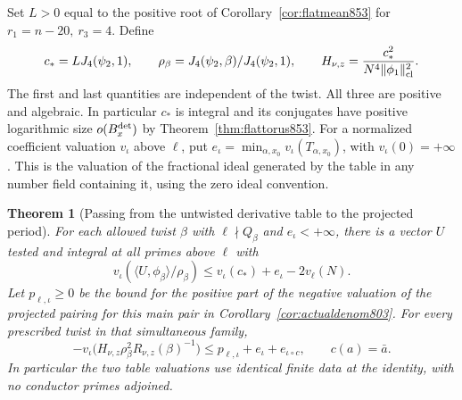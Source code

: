 \documentclass[a4paper,11pt]{article}
\newtheorem{theorem}[proposition]{Theorem}
\theoremstyle{definition}
\theoremstyle{remark}
\numberwithin{equation}{section}
\begin{document}
Set \(L>0\) equal to the positive root of
Corollary~\ref{cor:flatmean853} for \(r_1=n-20,\ r_3=4\).
Define
\[
   c_*=L J_4(\psi_2,1),\qquad
   \rho_\beta=J_4(\psi_2,\beta)/J_4(\psi_2,1),\qquad
   H_{\nu,z}=\frac{c_*^2}{N^4\|\phi_1\|_{\rm cl}^2}.
\]
The first and last quantities are independent of the twist.
All three are positive and algebraic. In particular \(c_*\)
is integral and its conjugates have positive logarithmic
size \(o(B_x^{\rm det})\) by Theorem~\ref{thm:flattorus853}.
For a normalized coefficient valuation \(v_\iota\) above
\(\ell\), put \(e_\iota=\min_{\alpha,x_0}v_\iota(T_{\alpha,x_0})\),
with \(v_\iota(0)=+\infty\). This is the valuation of the
fractional ideal generated by the table in any number field
containing it, using the zero ideal convention.

\begin{theorem}[Passing from the untwisted derivative table to the projected period]
\leavevmode\label{thm:twelftransfer855}
For each allowed twist \(\beta\) with \(\ell\nmid Q_\beta\)
and \(e_\iota<+\infty\), there is a vector \(U\) tested and
integral at all primes above \(\ell\) with
\[
        v_\iota(\langle U,\phi_\beta\rangle/\rho_\beta)
                    \le v_\iota(c_*)+e_\iota-2v_\ell(N).
\]
Let \(p_{\ell,\iota}\ge0\) be the bound for the positive part of
the negative valuation of the projected pairing for this main
pair in Corollary~\ref{cor:actualdenom803}. For every
prescribed twist in that simultaneous family,
\begin{equation}
  -v_\iota\bigl(H_{\nu,z}\rho_\beta^2 R_{\nu,z}(\beta)^{-1}\bigr)
                \le p_{\ell,\iota}+e_\iota+e_{\iota\circ c},
       \qquad c(a)=\bar a .
 \label{eq:tablevaluation855}
\end{equation}
In particular the two table valuations use identical finite
data at the identity, with no conductor primes adjoined.
\end{theorem}
\end{document}
